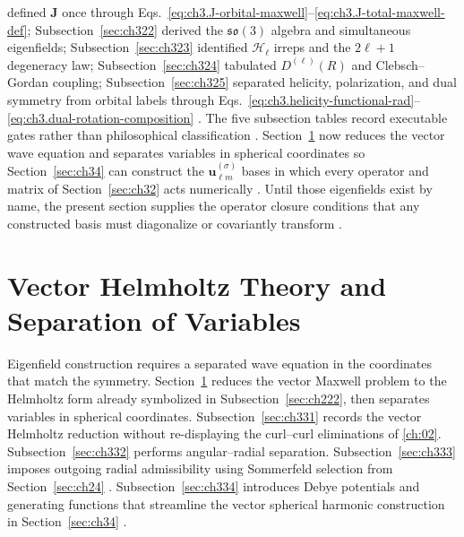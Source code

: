 defined \(\mathbf{J}\) once through Eqs.~\eqref{eq:ch3.J-orbital-maxwell}--\eqref{eq:ch3.J-total-maxwell-def};
Subsection~\ref{sec:ch322} derived the \(\mathfrak{so}(3)\) algebra and simultaneous eigenfields;
Subsection~\ref{sec:ch323} identified \(\mathcal{H}_{\ell}\) irreps and the \(2\ell+1\) degeneracy law;
Subsection~\ref{sec:ch324} tabulated \(D^{(\ell)}(R)\) and Clebsch--Gordan coupling;
Subsection~\ref{sec:ch325} separated helicity, polarization, and dual symmetry from orbital labels through
Eqs.~\eqref{eq:ch3.helicity-functional-rad}--\eqref{eq:ch3.dual-rotation-composition}
\cite{harrington2001}. The five subsection tables record executable gates rather than philosophical
classification \cite{stratton1941}. Section~\ref{sec:ch33} now reduces the vector wave equation and
separates variables in spherical coordinates so Section~\ref{sec:ch34} can construct the
\(\mathbf{u}_{\ell m}^{(\sigma)}\) bases in which every operator and matrix of Section~\ref{sec:ch32} acts
numerically \cite{hansen1988}. Until those eigenfields exist by name, the present section
supplies the operator closure conditions that any constructed basis must diagonalize or covariantly transform
\cite{hansen1988}.
\section{Vector Helmholtz Theory and Separation of Variables}
\label{sec:ch33}
Eigenfield construction requires a separated wave equation in the coordinates that match the symmetry.
Section~\ref{sec:ch33} reduces the vector Maxwell problem to the Helmholtz form already symbolized in
Subsection~\ref{sec:ch222}, then separates variables in spherical coordinates. Subsection~\ref{sec:ch331}
records the vector Helmholtz reduction without re-displaying the curl--curl eliminations of
\ref{ch:02}. Subsection~\ref{sec:ch332} performs angular--radial separation. Subsection~\ref{sec:ch333}
imposes outgoing radial admissibility using Sommerfeld selection from Section~\ref{sec:ch24}
\cite{stratton1941}. Subsection~\ref{sec:ch334} introduces Debye potentials and generating
functions that streamline the vector spherical harmonic construction in Section~\ref{sec:ch34}
\cite{stratton1941}.
